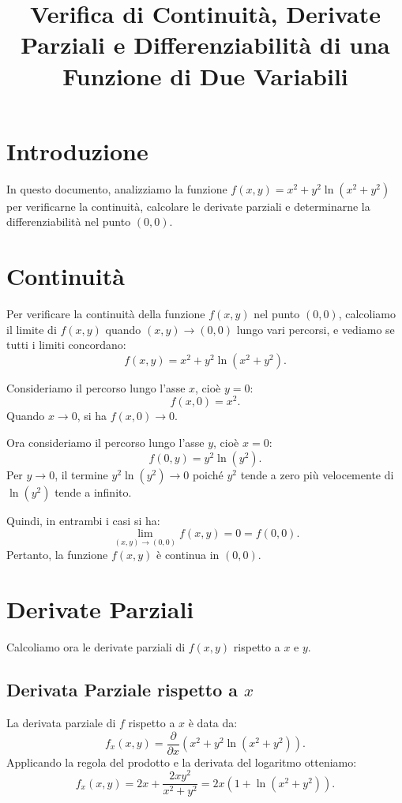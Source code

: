 \documentclass{article}
\title{Verifica di Continuità, Derivate Parziali e Differenziabilità di una Funzione di Due Variabili}
\author{}
\date{}
\begin{document}
\maketitle

\section*{Introduzione}
In questo documento, analizziamo la funzione \( f(x, y) = x^2 + y^2 \ln(x^2 + y^2) \) per verificarne la continuità, calcolare le derivate parziali e determinarne la differenziabilità nel punto \( (0, 0) \).

\section{Continuità}
Per verificare la continuità della funzione \( f(x, y) \) nel punto \( (0, 0) \), calcoliamo il limite di \( f(x, y) \) quando \( (x, y) \to (0, 0) \) lungo vari percorsi, e vediamo se tutti i limiti concordano:
\begin{equation*}
f(x, y) = x^2 + y^2 \ln(x^2 + y^2).
\end{equation*}

Consideriamo il percorso lungo l'asse \(x\), cioè \( y = 0 \):
\begin{equation*}
f(x, 0) = x^2.
\end{equation*}
Quando \( x \to 0 \), si ha \( f(x, 0) \to 0 \).

Ora consideriamo il percorso lungo l'asse \(y\), cioè \( x = 0 \):
\begin{equation*}
f(0, y) = y^2 \ln(y^2).
\end{equation*}
Per \( y \to 0 \), il termine \( y^2 \ln(y^2) \to 0 \) poiché \( y^2 \) tende a zero più velocemente di \( \ln(y^2) \) tende a infinito. 

Quindi, in entrambi i casi si ha:
\begin{equation*}
\lim_{(x, y) \to (0, 0)} f(x, y) = 0 = f(0, 0).
\end{equation*}
Pertanto, la funzione \( f(x, y) \) è continua in \( (0, 0) \).

\section{Derivate Parziali}
Calcoliamo ora le derivate parziali di \( f(x, y) \) rispetto a \( x \) e \( y \).

\subsection*{Derivata Parziale rispetto a \( x \)}
La derivata parziale di \( f \) rispetto a \( x \) è data da:
\begin{equation*}
f_x(x, y) = \frac{\partial}{\partial x} \left( x^2 + y^2 \ln(x^2 + y^2) \right).
\end{equation*}
Applicando la regola del prodotto e la derivata del logaritmo otteniamo:
\begin{equation*}
f_x(x, y) = 2x + \frac{2x y^2}{x^2 + y^2} = 2x \left(1 + \ln(x^2 + y^2)\right).
\end{equation*}
\end{document}
